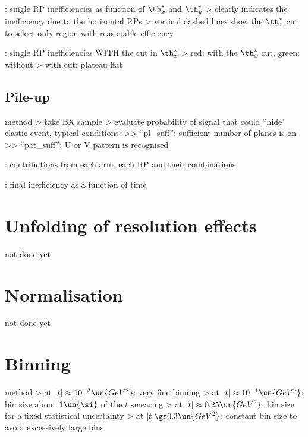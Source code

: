 \>  : single RP inefficiencies as function of $\th_x^*$ and $\th_y^*$
\>> clearly indicates the inefficiency due to the horizontal RPs
\>> vertical dashed lines show the $\th_x^*$ cut to select only region with reasonable efficiency

\>  : single RP inefficiencies WITH the cut in $\th_x^*$
\>> red: with the $\th_x^*$ cut, green: without
\>> with cut: plateau flat
\fi

\subsection{Pile-up}

\> method
\>> take BX sample
\>> evaluate probability of signal that could ``hide'' elastic event, typical conditions:
\>>> ``pl\_suff'': sufficient number of planes is on
\>>> ``pat\_suff'': U or V pattern is recognised 

\> : contributions from each arm, each RP and their combinations

\> : final inefficiency as a function of time



\section{Unfolding of resolution effects}

\> not done yet



\section{Normalisation}

\> not done yet



\section{Binning}

\> method
\>> at $|t| \approx 10^{-3}\un{GeV^2}$: very fine binning
\>> at $|t| \approx 10^{-1}\un{GeV^2}$: bin size about $1\un{\si}$ of the $t$ smearing
\>> at $|t| \approx 0.25\un{GeV^2}$: bin size for a fixed statistical uncertainty
\>> at $|t| \gs 0.3\un{GeV^2}$: constant bin size to avoid excessively large bins

